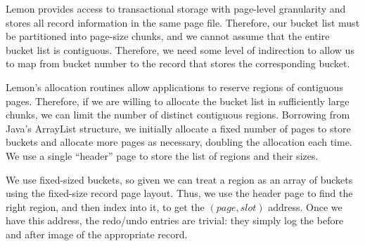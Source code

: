 \documentclass[letterpaper,twocolumn,english]{article}
\newcommand{\yad}{Lemon\xspace}
\newcommand{\rcs}[1]{\textcolor{green}{\bf RCS: #1}}
\begin{document}

\yad provides access to transactional storage with page-level
granularity and stores all record information in the same page file.
Therefore, our bucket list must be partitioned into page-size chunks,
and we cannot assume that the entire bucket list is contiguous.
Therefore, we need some level of indirection to allow us to map from
bucket number to the record that stores the corresponding bucket.

\yad's allocation routines allow applications to reserve regions of
contiguous pages.  Therefore, if we are willing to allocate the bucket
list in sufficiently large chunks, we can limit the number of distinct
contiguous regions.  Borrowing from Java's ArrayList structure, we
initially allocate a fixed number of pages to store buckets and
allocate more pages as necessary, doubling the allocation each
time. We use a single ``header'' page to store the list of regions and
their sizes.

We use fixed-sized buckets, so given we can treat a region as an array
of buckets using the fixed-size record page layout. Thus, we use the
header page to find the right region, and then index into it, to get
the $(page, slot)$ address.  Once we have this address, the redo/undo
entries are trivial: they simply log the before and after image of the
appropriate record.





\end{document}
